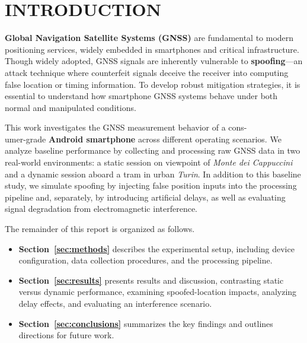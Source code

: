 
\section{INTRODUCTION} \label{sec:introduction}

    \textbf{Global Navigation Satellite Systems (GNSS)} are fundamental to modern positioning services, widely embedded in smartphones and critical infrastructure. 
    Though widely adopted, GNSS signals are inherently vulnerable to \textbf{spoofing}—an attack technique where counterfeit signals deceive the receiver into computing false location or timing information. 
    To develop robust mitigation strategies, it is essential to understand how smartphone GNSS systems behave under both normal and manipulated conditions.

    \noindent This work investigates the GNSS measurement behavior of a cons-\\umer-grade \textbf{Android smartphone} across different operating scenarios. 
    We analyze baseline performance by collecting and processing raw GNSS data in two real-world environments: a static session on viewpoint of \textit{Monte dei Cappuccini} and a dynamic session aboard a tram in urban \textit{Turin}. 
    In addition to this baseline study, we simulate spoofing by injecting false position inputs into the processing pipeline and, separately, by introducing artificial delays, as well as evaluating signal degradation from electromagnetic interference.

    \noindent The remainder of this report is organized as follows.
    
    \begin{itemize}
        \item \textbf{Section~\ref{sec:methods}} describes the experimental setup, including device configuration, data collection procedures, and the processing pipeline.
        \item \textbf{Section~\ref{sec:results}} presents results and discussion, contrasting static versus dynamic performance, examining spoofed-location impacts, analyzing delay effects, and evaluating an interference scenario.
        \item \textbf{Section~\ref{sec:conclusions}} summarizes the key findings and outlines directions for future work.
    \end{itemize}
